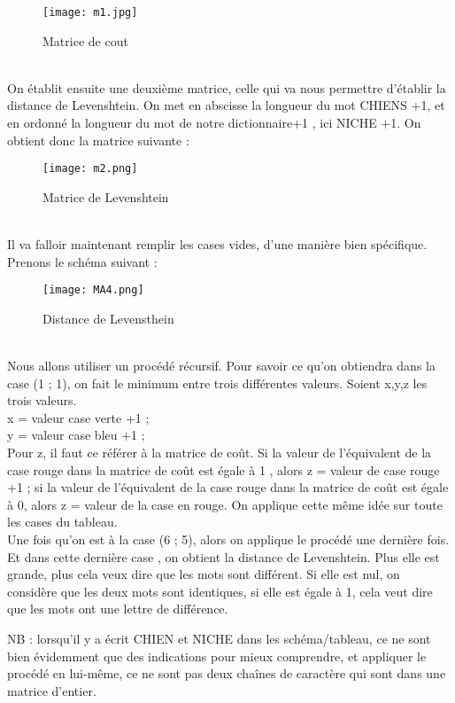\documentclass{article}
\begin{document}
    \begin{figure}[hp]
	    \centering
	    \texttt{[image: m1.jpg]}
	    \caption{Matrice de cout}
    \end{figure}
\\
On établit ensuite une deuxième matrice, celle qui va nous permettre d’établir la distance de Levenshtein. On met en abscisse la longueur du mot CHIENS +1, et en ordonné la longueur du mot de notre dictionnaire+1 , ici NICHE +1. On obtient donc la matrice suivante :\\
\newpage
    \begin{figure}[hp]
	    \centering
	    \texttt{[image: m2.png]}
	    \caption{Matrice de Levenshtein}
    \end{figure}
\\
Il va falloir maintenant remplir les cases vides, d’une manière bien spécifique. Prenons le schéma suivant :\\
    \begin{figure}[hp]
	    \centering
	    \texttt{[image: MA4.png]}
	    \caption{Distance de Levensthein}
    \end{figure}
\\
Nous allons utiliser un procédé récursif. Pour savoir ce qu’on obtiendra dans la case (1 ; 1), on fait le minimum entre trois différentes valeurs. Soient x,y,z les trois valeurs.\\
x = valeur case verte +1 ;\\
y = valeur case bleu +1 ;\\
Pour z, il faut ce référer à la matrice de coût. Si la valeur de l’équivalent de la case rouge dans la matrice de coût est égale à 1 , alors z = valeur de case rouge +1 ; si la valeur de l’équivalent de la case rouge dans la matrice de coût est égale à 0, alors z = valeur de la case en rouge.
On applique cette même idée sur toute les cases du tableau.\\
Une fois qu’on est à la case (6 ; 5), alors on applique le procédé une dernière fois.\\
Et dans cette dernière case , on obtient la distance de Levenshtein. Plus elle est grande, plus cela veux dire que les mots sont différent. Si elle est nul, on considère que les deux mots sont identiques, si elle est égale à 1, cela veut dire que les mots ont une lettre de différence.

NB : lorsqu’il y a écrit CHIEN et NICHE dans les schéma/tableau, ce ne sont bien évidemment que des indications pour mieux comprendre, et appliquer le procédé en lui-même, ce ne sont pas deux chaînes de caractère qui sont dans une matrice d’entier.\\
\end{document}
